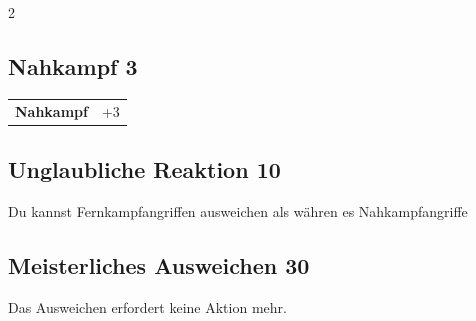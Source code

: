 \begin{multicols}{2}
\begin{tcolorbox}
\end{tcolorbox}

\begin{tcolorbox}
    \subsection*{Nahkampf \hfill \small{3 }}
    \tcblower




\begin{tabular}{@{}ll@{}}
    \textbf{Nahkampf} & +3\\
\end{tabular}


\end{tcolorbox}

\begin{tcolorbox}
    \subsection*{Unglaubliche Reaktion \hfill \small{10 }}
    \tcblower
Du kannst Fernkampfangriffen ausweichen als währen es Nahkampfangriffe


\vspace{3mm}



\end{tcolorbox}

\begin{tcolorbox}
    \subsection*{Meisterliches Ausweichen \hfill \small{30 }}
    \tcblower
Das Ausweichen erfordert keine Aktion mehr.


\vspace{3mm}




\end{tcolorbox}
\end{multicols}
